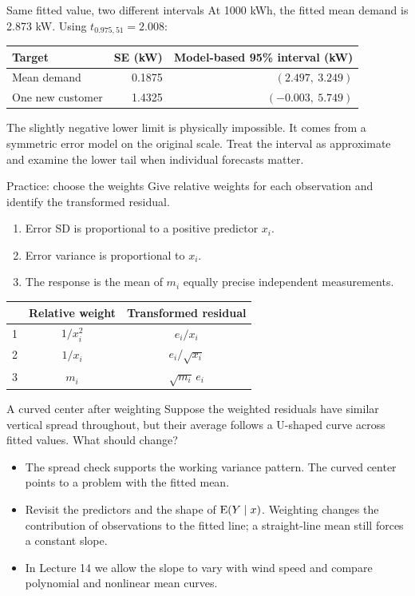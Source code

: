 \begin{frame}{Same fitted value, two different intervals}
    At 1000 kWh, the fitted mean demand is 2.873 kW. Using $t_{0.975,51}=2.008$:
    \begin{center}
        \begin{tabular}{lrr}
            \toprule Target & SE (kW) & Model-based 95\% interval (kW) \\ \midrule
            Mean demand & 0.1875 & $(2.497,\ 3.249)$ \\
            One new customer & 1.4325 & $(-0.003,\ 5.749)$ \\ \bottomrule
        \end{tabular}
    \end{center}
    The slightly negative lower limit is physically impossible. It comes from a symmetric error model on the original scale. Treat the interval as approximate and examine the lower tail when individual forecasts matter.
\end{frame}
\begin{frame}{Practice: choose the weights}
    Give relative weights for each observation and identify the transformed residual.
    \begin{enumerate}
        \item Error SD is proportional to a positive predictor $x_i$.
        \item Error variance is proportional to $x_i$.
        \item The response is the mean of $m_i$ equally precise independent measurements.
    \end{enumerate}
    \pause
    \begin{center}
        \begin{tabular}{lcc}
            \toprule & Relative weight & Transformed residual \\ \midrule
            1 & $1/x_i^2$ & $e_i/x_i$ \\
            2 & $1/x_i$ & $e_i/\sqrt{x_i}$ \\
            3 & $m_i$ & $\sqrt{m_i}\,e_i$ \\ \bottomrule
        \end{tabular}
    \end{center}
\end{frame}

\begin{frame}{A curved center after weighting}
    Suppose the weighted residuals have similar vertical spread throughout, but their average follows a U-shaped curve across fitted values. What should change?
    \pause
    \begin{itemize}
        \item The spread check supports the working variance pattern. The curved center points to a problem with the fitted mean.
        \item Revisit the predictors and the shape of $\operatorname{E}(Y\mid x)$. Weighting changes the contribution of observations to the fitted line; a straight-line mean still forces a constant slope.
        \item In Lecture 14 we allow the slope to vary with wind speed and compare polynomial and nonlinear mean curves.
    \end{itemize}
\end{frame}
